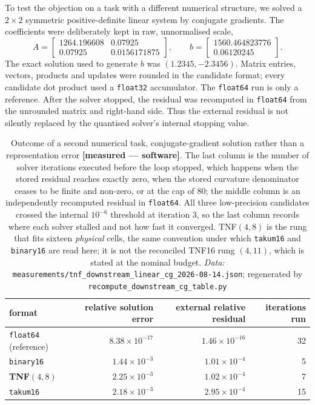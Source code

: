 \documentclass[11pt]{article}
\theoremstyle{definition}
\begin{document}
To test the objection on a task with a different numerical structure, we solved a
$2\times2$ symmetric positive-definite linear system by conjugate gradients.
The coefficients were deliberately kept in raw, unnormalised scale,
\[
A=\begin{bmatrix}1264.196608&0.07925\\0.07925&0.0156171875\end{bmatrix},
\qquad
b=\begin{bmatrix}1560.464823776\\0.06120245\end{bmatrix}.
\]
The exact solution used to generate $b$ was $(1.2345,-2.3456)$. Matrix entries,
vectors, products and updates were rounded in the candidate format; every
candidate dot product used a \texttt{float32} accumulator. The \texttt{float64}
run is only a reference. After the solver stopped, the residual was recomputed
in \texttt{float64} from the unrounded matrix and right-hand side. Thus the
external residual is not silently replaced by the quantised solver's internal
stopping value.

\begin{table}[t]\centering\small
\caption{Outcome of a second numerical task, conjugate-gradient solution rather
than a representation error \textbf{[measured --- software]}. The last column is
the number of solver iterations executed before the loop stopped, which happens when
the stored residual reaches exactly zero, when the stored curvature denominator
ceases to be finite and non-zero, or at the cap of $80$; the middle column is an
independently recomputed residual in \texttt{float64}. All three low-precision
candidates crossed the internal $10^{-6}$ threshold at iteration 3, so the last
column records where each solver stalled and not how fast it converged.
TNF$(4,8)$ is the rung that fits sixteen \emph{physical} cells, the same
convention under which \texttt{takum16} and \texttt{binary16} are read here; it
is not the reconciled TNF16 rung $(4,11)$, which is stated at the nominal
budget. \emph{Data:} \texttt{measurements/tnf\_downstream\_linear\_cg\_2026-08-14.json}; regenerated by \texttt{recompute\_downstream\_cg\_table.py}}
\label{tab:downstream-cg}
\begin{tabular}{lrrr}
\toprule
format & relative solution error & external relative residual & iterations run \\
\midrule
\texttt{float64} (reference) & $8.38\times10^{-17}$ & $1.46\times10^{-16}$ & 32 \\
\texttt{binary16}            & $1.44\times10^{-3}$  & $1.01\times10^{-4}$  & 5  \\
\textbf{TNF$(4,8)$}          & $2.25\times10^{-3}$  & $1.02\times10^{-4}$  & 7  \\
\texttt{takum16}             & $2.18\times10^{-3}$  & $2.95\times10^{-4}$  & 15 \\
\bottomrule
\end{tabular}
\end{table}
\end{document}
